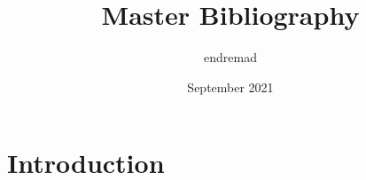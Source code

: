\documentclass{article}
\title{Master Bibliography}
\author{endremad }
\date{September 2021}
\begin{document}
\maketitle

\section{Introduction}
\end{document}
